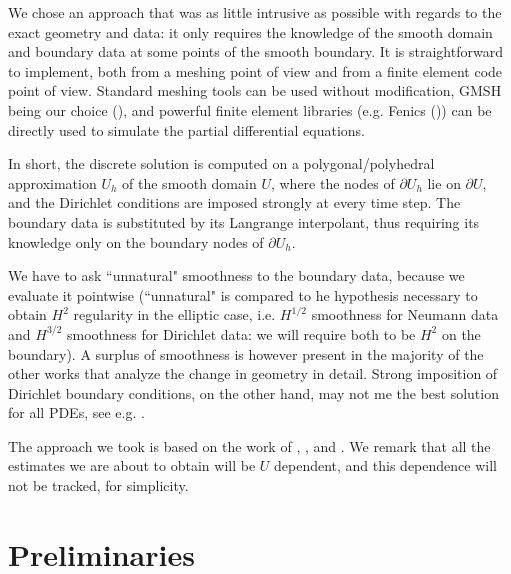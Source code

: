\documentclass[english,a4paper,9pt,oneside]{scrbook}	%
\theoremstyle{break}
\theoremstyle{remark}
\begin{document}
\begin{appendices}
We chose an approach that was as little intrusive as possible with regards to the exact geometry and data: it only requires the knowledge of the smooth domain and boundary data at some points of the smooth boundary. It is straightforward to implement, both from a meshing point of view and from a finite element code point of view. Standard meshing tools can be used without modification, GMSH being our choice (\cite{gmsh}), and powerful finite element libraries (e.g. Fenics (\cite{fenics})) can be directly used to simulate the partial differential equations.

In short, the discrete solution is computed on a polygonal/polyhedral approximation $U_h$ of the smooth domain $U$, where the nodes of $\partial U_h$ lie on $\partial U$, and the Dirichlet conditions are imposed strongly at every time step. The boundary data is substituted by its Langrange interpolant, thus requiring its knowledge only on the boundary nodes of $\partial U_h$.

We have to ask ``unnatural" smoothness to the boundary data, because we evaluate it pointwise (``unnatural" is compared to he hypothesis necessary to obtain $H^2$ regularity in the elliptic case, i.e. $H^{1/2}$ smoothness for Neumann data and $H^{3/2}$ smoothness for Dirichlet data: we will require both to be $H^2$ on the boundary). A surplus of smoothness is however present in the majority of the other works that analyze the change in geometry in detail. Strong imposition of Dirichlet boundary conditions, on the other hand, may not me the best solution for all PDEs, see e.g. \cite{hughes}.

The approach we took is based on the work of \cite{elliott}, \cite{ranner}, \cite{bernardi} and \cite{edelmann}. We remark that all the estimates we are about to obtain will be $U$ dependent, and this dependence will not be tracked, for simplicity.



\section{Preliminaries}


\end{appendices}
\end{document}
